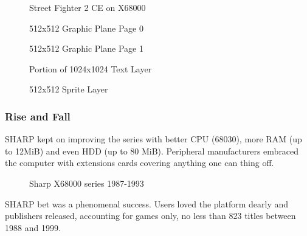 \begin{figure}[H]
\caption*{Street Fighter 2 CE on X68000}
\end{figure}


\begin{minipage}[t]{0.49\linewidth}
\setlength{\intextsep}{0pt}
\begin{figure}[H]
\caption*{512x512 Graphic Plane Page 0}
\end{figure}
\end{minipage}%
\hfill
\begin{minipage}[t]{0.49\linewidth}
\setlength{\intextsep}{0pt}
  \begin{figure}[H]
  \caption*{512x512 Graphic Plane Page 1}
  \end{figure}
\end{minipage}%

\begin{minipage}[t]{0.49\linewidth}
  \begin{figure}[H]
  \caption*{Portion of 1024x1024 Text Layer}
  \end{figure}
\end{minipage}%
\hfill
\begin{minipage}[t]{0.49\linewidth}
   \begin{figure}[H]
  \caption*{512x512 Sprite Layer}
  \end{figure}
\end{minipage}%



\subsubsection{Rise and Fall}
 SHARP kept on improving the series with better CPU (68030), more RAM (up to 12MiB) and even HDD (up to 80 MiB). Peripheral manufacturers embraced the computer with extensions cards covering anything one can thing off. 


\begin{figure}[H]
\caption*{Sharp X68000 series 1987-1993}
\end{figure}






 SHARP bet was a phenomenal success. Users loved the platform dearly and publishers released, accounting for games only, no less than 823 titles between 1988 and 1999.




